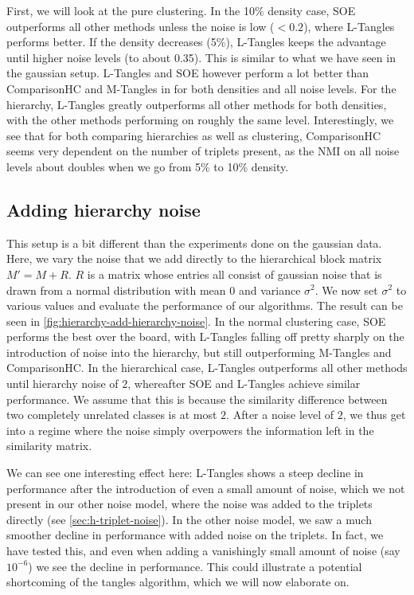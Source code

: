 First, we will look at the pure clustering. In the 10\% density case, SOE outperforms all other methods unless the noise is
low ($<0.2$), where L-Tangles performs better. If the density decreases (5\%), L-Tangles keeps the 
advantage until higher noise levels (to about 0.35). 
This is similar to what we have seen in the gaussian setup.
L-Tangles and SOE however perform a lot better than ComparisonHC and M-Tangles in for both densities and all noise levels.  For the hierarchy, L-Tangles greatly outperforms all other methods for both densities,
with the other methods performing on roughly the same level. Interestingly, 
we see that for both comparing hierarchies as well as clustering, 
ComparisonHC seems very dependent on the number of triplets present, as the NMI on all noise levels
about doubles when we go from 5\% to 10\% density.


\subsection{Adding hierarchy noise}\label{sec:adding-hierarchy-noise}
This setup is a bit different than the experiments done on the gaussian data. Here, we vary the noise that we add directly to the hierarchical block matrix $M' = M + R$. 
$R$ is a matrix whose entries all consist of gaussian noise that is drawn from a normal distribution with mean $0$ and variance $\sigma^2$. We now set $\sigma^2$ to various 
values and evaluate the performance of our algorithms. The result can be seen in \autoref{fig:hierarchy-add-hierarchy-noise}. In the normal clustering case, SOE performs the best over the board, with L-Tangles
falling off pretty sharply on the introduction of noise into the hierarchy, but still outperforming M-Tangles and ComparisonHC. In the hierarchical case, L-Tangles outperforms all other methods until hierarchy noise of $2$, whereafter SOE and L-Tangles achieve similar performance. We assume that this is because 
the similarity difference between two completely unrelated classes is at most $2$. After a noise level 
of $2$, we thus get into a regime where the noise simply overpowers the information left in the similarity matrix.

We can see one interesting effect here: L-Tangles shows a steep decline in performance after the introduction of even a small amount of noise, which we not present in our other noise model, where the
noise was added to the triplets directly (see \autoref{sec:h-triplet-noise}).
In the other noise model, we saw a much smoother decline in performance with added noise on the triplets. 
In fact, we have tested this, and even when adding a vanishingly small amount of noise (say $10^{-6}$) we
see the decline in performance. This could illustrate a potential shortcoming of the tangles algorithm,
which we will now elaborate on.

